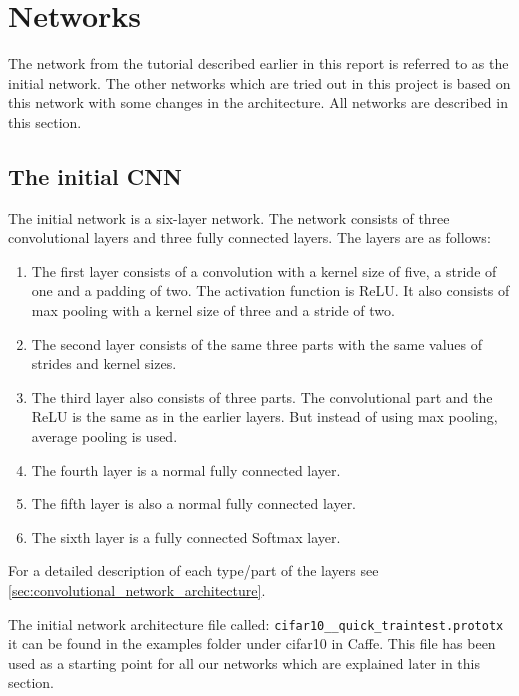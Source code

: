 \graphicspath{{Chapters/Project/}}

\section{Networks} %
\label{sec:networks}

The network from the tutorial described earlier in this report is referred to
as the initial network. The other networks which are tried out in this
project is based on this network with some changes in the architecture. All
networks are described in this section.

\subsection{The initial CNN} %
\label{sub:the_initial_network}

The initial network is a six-layer network. The network consists of three
convolutional layers and three fully connected layers. The layers are as
follows:

\begin{enumerate}
	\item The first layer consists of a convolution with a kernel size of five, a
	stride of one and a padding of two. The activation function is ReLU. It
	also consists of max pooling with a kernel size of three and a stride of two.
	\item The second layer consists of the same three parts with the same values
	of strides and kernel sizes.
	\item The third layer also consists of three parts. The convolutional part
	and the ReLU is the same as in the earlier layers. But instead of using max
	pooling, average pooling is used.
	\item The fourth layer is a normal fully connected layer.
	\item The fifth layer is also a normal fully connected layer.
	\item The sixth layer is a fully connected Softmax layer.
\end{enumerate}
For a detailed description of each type/part of the layers see
\autoref{sec:convolutional_network_architecture}.

The initial network architecture file called:
\verb|cifar10__quick_traintest.prototx| it can be found in the examples folder
under cifar10 in Caffe\cite{caffe}. This file has been used as a starting point
for all our networks which are explained later in this section. 

